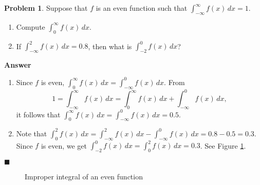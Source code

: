 \documentclass[12pt,letterpaper]{book}
\numberwithin{equation}{section}
\theoremstyle{definition}
\newtheorem{problem}[thm]{\textbf{Problem}}
\newenvironment{answer}{\noindent\textbf{Answer}}{\hfill$\blacksquare$\vspace{0.1in}}
\begin{document}
\begin{problem}
Suppose that $f$ is an even function such that $\displaystyle{\int_{-\infty}^\infty f(x)\,dx=1}$.
\begin{enumerate}
\item Compute $\displaystyle{\int_{0}^\infty f(x)\,dx}$.
\item If $\displaystyle{\int_{-\infty}^2 f(x)\,dx=0.8}$, then what is $\displaystyle{\int_{-2}^0 f(x)\,dx}$?
\end{enumerate}
\end{problem}

\begin{answer}
\begin{enumerate}
\item Since $f$ is even, $\displaystyle{\int_{0}^\infty f(x)\,dx=\int_{-\infty}^0 f(x)\,dx}$. From
$$1=\int_{-\infty}^\infty f(x)\,dx=\int_{0}^\infty f(x)\,dx+\int_{-\infty}^0 f(x)\,dx,$$
it follows that $\displaystyle{\int_{0}^\infty f(x)\,dx=\int_{-\infty}^0 f(x)\,dx=0.5}$.
\item Note that $\displaystyle{\int_{0}^2 f(x)\,dx=\int_{-\infty}^2 f(x)\,dx-\int_{-\infty}^0 f(x)\,dx=0.8-0.5=0.3}$.
Since $f$ is even, we get $\displaystyle{\int_{-2}^0 f(x)\,dx=\int_{0}^2 f(x)\,dx=0.3}$. See Figure \ref{even improper}.
\end{enumerate}
\end{answer}

\begin{figure}[h]
\begin{center}
\caption{Improper integral of an even function}
\label{even improper}
\end{center}
\end{figure}
\end{document}
